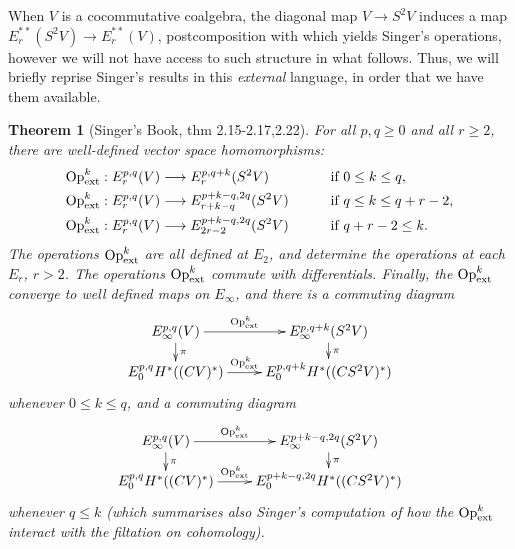 \documentclass[11pt]{amsart}
\theoremstyle{plain}
\newtheorem{thm}{Theorem}[section]
\theoremstyle{definition}
\renewcommand{\to}{\longrightarrow}
\theoremstyle{plain}
\newcommand{\ExtCohOp}{\textup{Op}_\textup{ext}}
\begin{document}
\begin{Composite functor spectral sequences}
When $V$ is a cocommutative coalgebra, the diagonal map $V\to S^2V$ induces a map $E_r^{**}(S^2V)\to E_r^{**}(V)$, postcomposition with which yields Singer's operations, however we will not have access to such structure in what follows. Thus, we will briefly reprise Singer's results in this \emph{external} language, in order that we have them available.
\begin{thm}[Singer's Book, thm 2.15-2.17,2.22]
For all $p,q\geq0$ and all $r\geq2$, there are well-defined vector space homomorphisms:
\begin{alignat*}{2}
\ExtCohOp^k:E^{p,q}_r(V)&\to E^{p,q+k}_r(S^2V)&\qquad&\text{if }0\leq k \leq q,\\
\ExtCohOp^k:E^{p,q}_r(V)&\to E^{p+k-q,2q}_{r+k-q}(S^2V)&\qquad&\text{if }q\leq k\leq q+r-2,\\
\ExtCohOp^k:E^{p,q}_r(V)&\to E^{p+k-q,2q}_{2r-2}(S^2V)&\qquad&\text{if }q+r-2\leq k.
\end{alignat*}
The operations $\ExtCohOp^k$ are all defined at $E_2$, and determine the operations at each $E_r$, $r>2$. The operations $\ExtCohOp^k$ commute with differentials. Finally, the $\ExtCohOp^k$ converge to well defined maps on $E_\infty$, and there is a commuting diagram
\[\xymatrix@R=4mm{
E^{p,q}_\infty(V)\ar[r]^-{\ExtCohOp^k}\ar[d]^-{\pi}
&%
E^{p,q+k}_\infty(S^2V)\ar[d]^-{\pi}
\\%
E_0^{p,q}H^*((CV)^*)\ar[r]^-{\ExtCohOp^k}&%
E_0^{p,q+k}H^*((CS^2V)^*)%
}\]
whenever $0\leq k\leq q$, and a commuting diagram
\[\xymatrix@R=4mm{
E^{p,q}_\infty(V)\ar[r]^-{\ExtCohOp^k}\ar[d]^-{\pi}
&%
E^{p+k-q,2q}_\infty(S^2V)\ar[d]^-{\pi}
\\%
E_0^{p,q}H^*((CV)^*)\ar[r]^-{\ExtCohOp^k}&%
E_0^{p+k-q,2q}H^*((CS^2V)^*)%
}\]
whenever $q\leq k$ (which summarises also Singer's computation of how the $\ExtCohOp^k$ interact with the filtation on cohomology).


\end{thm}
\end{Composite functor spectral sequences}
\end{document}
